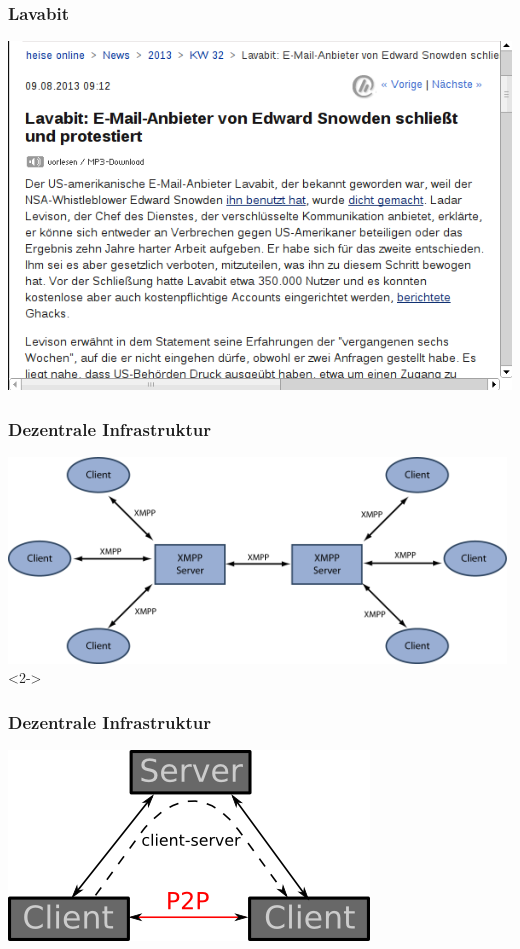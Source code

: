\documentclass[12pt]{beamer}
\begin{document}
\begin{frame}
    \frametitle{Lavabit}
    \includegraphics[height=0.6\textheight]{img/heise_lavabit.png}
\end{frame}

\begin{frame}
    \frametitle{Dezentrale Infrastruktur}
    \includegraphics[height=0.5\textheight]{img/xmpp1.png}<2->
\end{frame}

\begin{frame}
    \frametitle{Dezentrale Infrastruktur}
    \includegraphics[height=0.5\textheight]{img/client-server-graph.png}
\end{frame}
\end{document}

